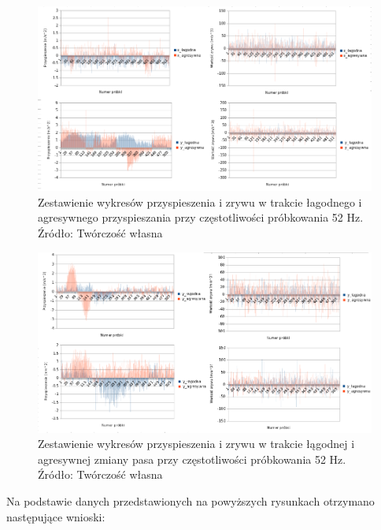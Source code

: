 \begin{figure}[H]
	\centering
	\includegraphics[width=16cm]{img/driving_analysis/zestawienie_lagodna_ostra-ruszanie.png}
	\caption{Zestawienie wykresów przyspieszenia i zrywu w trakcie łagodnego i agresywnego przyspieszania przy częstotliwości próbkowania 52 Hz.
	\\Źródło: Twórczość własna}
	\label{fig:image_driving_analysis_test_acc_light_aggressive_52Hz}
\end{figure}

\begin{figure}[H]
	\centering
	\includegraphics[width=16cm]{img/driving_analysis/zestawienie_ostra_lagodna.png}
	\caption{Zestawienie wykresów przyspieszenia i zrywu w trakcie łągodnej i agresywnej zmiany pasa przy częstotliwości próbkowania 52 Hz.
	\\Źródło: Twórczość własna}
	\label{fig:image_driving_analysis_test_acc_light_hard_lane_52Hz}
\end{figure}


\clearpage
Na podstawie danych przedstawionych na powyższych rysunkach otrzymano następujące wnioski:

